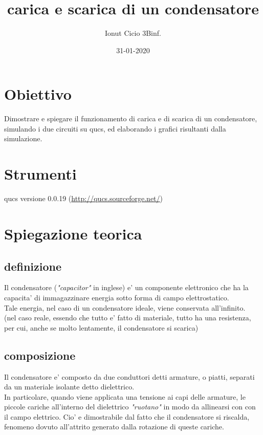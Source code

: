\documentclass[12pt]{article}
\begin{document}
\title{carica e scarica di un condensatore}
\author{Ionut Cicio 3Binf.}
\date{31-01-2020}

\maketitle

\section*{Obiettivo}
Dimostrare e spiegare il funzionamento di carica e di scarica di un condensatore,
simulando i due circuiti su qucs, ed elaborando i grafici risultanti dalla simulazione.

\section*{Strumenti}
qucs versione 0.0.19 (\url{http://qucs.sourceforge.net/})

\section*{Spiegazione teorica}

\subsection*{definizione}
Il condensatore (\textit{"capacitor"} in inglese) e' un componente elettronico che ha la capacita' di immagazzinare energia sotto forma di campo elettrostatico. \\
Tale energia, nel caso di un condensatore ideale, viene conservata all'infinito.\\
(nel caso reale, essendo che tutto e' fatto di materiale, tutto ha una resistenza, per cui, anche se molto lentamente, il condensatore si scarica)

\subsection*{composizione}
Il condensatore e' composto da due conduttori detti armature, o piatti, separati da un materiale isolante detto dielettrico. \\
In particolare, quando viene applicata una tensione ai capi delle armature, le piccole cariche all'interno del dielettrico \textit{"ruotano"} in modo da allinearsi con con il campo elettrico.
Cio' e dimostrabile dal fatto che il condensatore si riscalda, fenomeno dovuto all'attrito generato dalla rotazione di queste cariche. \\
\end{document}

